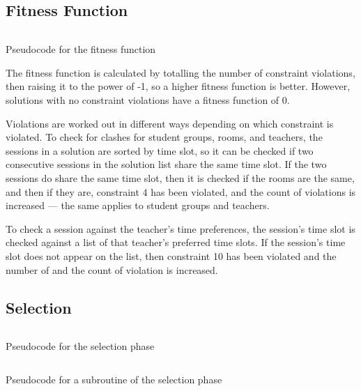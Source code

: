 \documentclass[a4paper, 12pt]{report}
\begin{document}
\newpage

\subsection{Fitness Function}

\begin{listing}[!ht]
	\inputminted[linenos, fontsize=\footnotesize]{text}{code/fitness.txt}
	\caption{Pseudocode for the fitness function}
	\label{listing:fitness}
\end{listing}

The fitness function is calculated by totalling the number of constraint 
violations, then raising it to the power of -1, so a higher fitness function is 
better.
However, solutions with no constraint violations have a fitness function of 0.

Violations are worked out in different ways depending on which constraint is
violated.
To check for clashes for student groups, rooms, and teachers, the sessions in a 
solution are sorted by time slot, so it can be checked if two consecutive 
sessions in the solution list share the same time slot.
If the two sessions do share the same time slot, then it is checked if the rooms
are the same, and then if they are, constraint 4 has been violated, and the 
count of violations is increased --- the same applies to student groups and 
teachers.

To check a session against the teacher's time preferences, the session's time 
slot is checked against a list of that teacher's preferred time slots.
If the session's time slot does not appear on the list, then constraint 10 has 
been violated and the number of and the count of violation is increased.

\newpage

\subsection{Selection}

\begin{listing}[!ht]
	\inputminted[linenos, fontsize=\footnotesize]{text}{code/select-parents.txt}
	\caption{Pseudocode for the selection phase}
	\label{listing:select-parents}
\end{listing}

\begin{listing}[!ht]
	\inputminted[linenos, fontsize=\footnotesize]{text}{code/choose-parent.txt}
	\caption{Pseudocode for a subroutine of the selection phase}
	\label{listing:choose-parent}
\end{listing}
\end{document}
